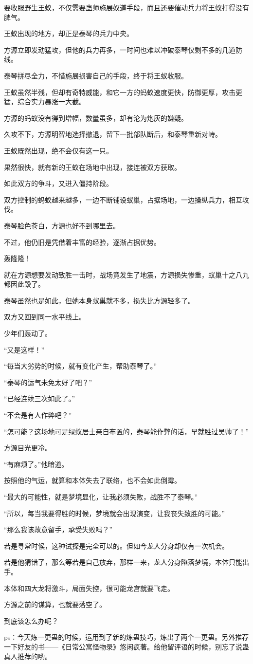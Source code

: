 \begin{this_body}
要收服野生王蚁，不仅需要蛊师施展奴道手段，而且还要催动兵力将王蚁打得没有脾气。

王蚁出现的地方，却正是泰琴的兵力中央。

方源立即发动猛攻，但他的兵力再多，一时间也难以冲破泰琴仅剩不多的几道防线。

泰琴拼尽全力，不惜施展损害自己的手段，终于将王蚁收服。

王蚁虽然半残，但却有奇特威能，和它一方的蚂蚁速度更快，防御更厚，攻击更猛，综合实力暴涨一大截。

方源的蚂蚁没有得到增幅，数量虽多，却有沦为炮灰的嫌疑。

久攻不下，方源明智地选择撤退，留下一批部队断后，和泰琴重新对峙。

王蚁既然出现，绝不会仅有这一只。

果然很快，就有新的王蚁在场地中出现，接连被双方获取。

如此双方的争斗，又进入僵持阶段。

双方控制的蚂蚁越来越多，一边不断铺设蚁巢，占据场地，一边操纵兵力，相互攻伐。

泰琴脸色苍白，方源也好不到哪里去。

不过，他仍旧是凭借着丰富的经验，逐渐占据优势。

轰隆隆！

就在方源想要发动致胜一击时，战场竟发生了地震，方源损失惨重，蚁巢十之八九都因此毁了。

泰琴虽然也是如此，但她本身蚁巢就不多，损失比方源轻多了。

双方又回到同一水平线上。

少年们轰动了。

“又是这样！”

“每当大劣势的时候，就有变化产生，帮助泰琴了。”

“泰琴的运气未免太好了吧？”

“已经连续三次如此了。”

“不会是有人作弊吧？”

“怎可能？这场地可是绿蚁居士亲自布置的，泰琴能作弊的话，早就胜过吴帅了！”

方源目光更冷。

“有麻烦了。”他暗道。

按照他的气运，就算和本体失去了联络，也不会如此倒霉。

“最大的可能性，就是梦境显化，让我必须失败，战胜不了泰琴。”

“所以，每当我要得胜的时候，梦境就会出现演变，让我丧失致胜的可能。”

“那么我该故意留手，承受失败吗？”

若是寻常时候，这种试探是完全可以的。但如今龙人分身却仅有一次机会。

若是他猜错了，那么等若是自己放弃，那样一来，龙人分身陷落梦境，本体只能出手。

本体和四大龙将激斗，局面失控，很可能龙宫就要飞走。

方源之前的谋算，也就要落空了。

到底该怎么办呢？

ps：今天炼一更蛊的时候，运用到了新的炼蛊技巧，炼出了两个一更蛊。另外推荐一下好友的书——《日常公寓怪物录》悠闲疯著。给他留评语的时候，别忘了说蛊真人推荐的哟。

\end{this_body}

